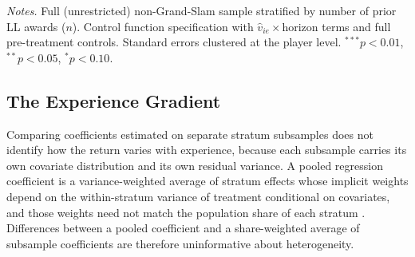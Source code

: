 \begin{table}[htbp]
\centering
\caption{Marginal Impact by LL Experience: Non-Grand-Slam Samples}
\label{tab:marginal_ngs}
\begin{threeparttable}
\scriptsize

\begin{tablenotes}
\footnotesize
\item \textit{Notes.} Full (unrestricted) non-Grand-Slam sample stratified by number of prior LL awards ($n$). Control function specification with $\hat{v}_{ie} \times \text{horizon}$ terms and full pre-treatment controls. Standard errors clustered at the player level. $^{***}p<0.01$, $^{**}p<0.05$, $^{*}p<0.10$.
\end{tablenotes}
\end{threeparttable}
\end{table}

\subsection{The Experience Gradient}
\label{sec:robustness_saturated}

Comparing coefficients estimated on separate stratum subsamples does not identify how the return varies with experience, because each subsample carries its own covariate distribution and its own residual variance. A pooled regression coefficient is a variance-weighted average of stratum effects whose implicit weights depend on the within-stratum variance of treatment conditional on covariates, and those weights need not match the population share of each stratum \citep{Sloczynski2022_interpreting_ols}. Differences between a pooled coefficient and a share-weighted average of subsample coefficients are therefore uninformative about heterogeneity.

